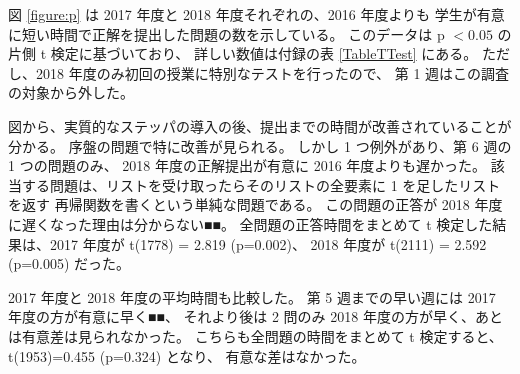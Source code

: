 図 \ref{figure:p} は
2017 年度と 2018 年度それぞれの、2016 年度よりも
学生が有意に短い時間で正解を提出した問題の数を示している。
このデータは p $< 0.05$ の片側 t 検定に基づいており、
詳しい数値は付録の表 \ref{TableTTest} にある。
ただし、2018 年度のみ初回の授業に特別なテストを行ったので、
第 1 週はこの調査の対象から外した。

図から、実質的なステッパの導入の後、提出までの時間が改善されていることが分かる。
序盤の問題で特に改善が見られる。
しかし 1 つ例外があり、第 6 週の 1 つの問題のみ、
2018 年度の正解提出が有意に 2016 年度よりも遅かった。
該当する問題は、リストを受け取ったらそのリストの全要素に 1 を足したリストを返す
再帰関数を書くという単純な問題である。
この問題の正答が 2018 年度に遅くなった理由は分からない■■。
全問題の正答時間をまとめて t 検定した結果は、2017 年度が t(1778) = 2.819 (p=0.002)、
2018 年度が t(2111) = 2.592 (p=0.005) だった。

2017 年度と 2018 年度の平均時間も比較した。
第 5 週までの早い週には 2017 年度の方が有意に早く■■、
それより後は 2 問のみ 2018 年度の方が早く、あとは有意差は見られなかった。
こちらも全問題の時間をまとめて t 検定すると、t(1953)=0.455 (p=0.324) となり、
有意な差はなかった。

